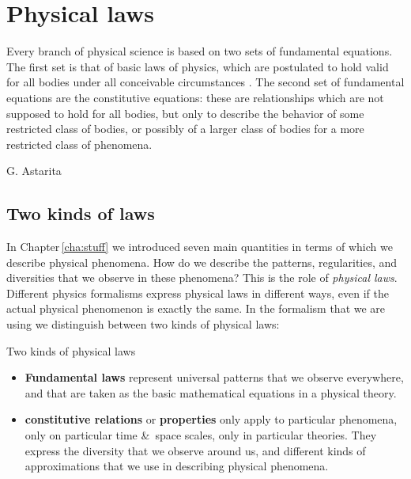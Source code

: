\documentclass[a4paper,12pt,%
onecolumn,oneside,titlepage,%
british%
]{memoir}
\newcommand*{\amp}{\&}
\renewcommand*{\|}[1][]{\nonscript\:#1\vert\nonscript\:\mathopen{}}
\newcommand*{\chap}{Chapter}%
\begin{document}
\printpagenotes*
\clearpage
\chapter{Physical laws}
\label{cha:laws}


\epigraph{Every branch of physical science is based on two sets of fundamental equations. The first set is that of basic laws of physics, which are postulated to hold valid for all bodies under all conceivable circumstances \textelp{}. The second set of fundamental equations are the constitutive equations: these are relationships which are not supposed to hold for all bodies, but only to describe the behavior of some restricted class of bodies, or possibly of a larger class of bodies for a more restricted class of phenomena.}{G. Astarita \cites*{astarita1989_r1990}}

\section{Two kinds of laws}
\label{sec:two_kinds}

In \chap\,\ref{cha:stuff} we introduced seven main quantities in terms of which we describe physical phenomena. How do we describe the patterns, regularities, and diversities that we observe in these phenomena? This is the role of \emph{physical laws}. Different physics formalisms express physical laws in different ways, even if the actual physical phenomenon is exactly the same. In the formalism that we are using we distinguish between two kinds of physical laws:
\begin{definition}{Two kinds of physical laws}
  \begin{itemize}
  \item\textbf{Fundamental laws} represent universal patterns that we observe everywhere, and that are taken as the basic mathematical equations in a physical theory.

  \item\textbf{constitutive relations} or \textbf{properties} only apply to particular phenomena, only on particular time \amp\ space scales, only in particular theories. They express the diversity that we observe around us, and different kinds of approximations that we use in describing physical phenomena.
  \end{itemize}
\end{definition}
\end{document}
